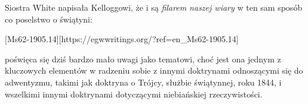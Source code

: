 Siostra White napisała Kelloggowi, że  i  są \textit{filarem naszej wiary} w ten sam sposób co poselstwo o świątyni:

[Ms62-1905.14][https://egwwritings.org/?ref=en\_Ms62-1905.14]

 poświęca się dziś bardzo mało uwagi jako tematowi, choć jest ona jednym z kluczowych elementów w radzeniu sobie z innymi doktrynami odnoszącymi się do adwentyzmu, takimi jak doktryna o Trójcy, służbie świątynnej, roku 1844, i wszelkimi innymi doktrynami dotyczącymi niebiańskiej rzeczywistości.

